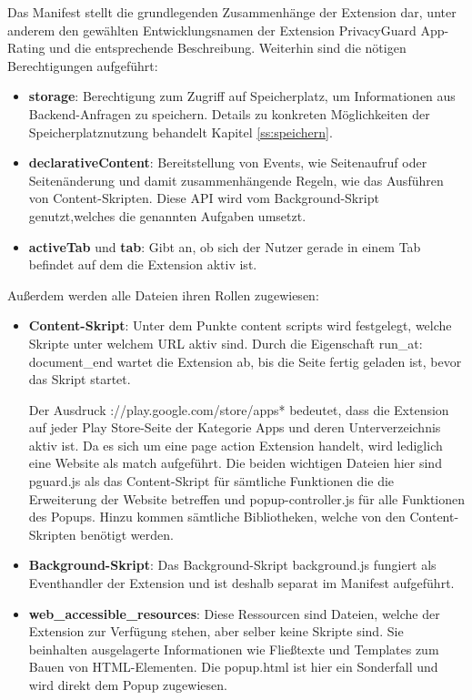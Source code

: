Das Manifest stellt die grundlegenden Zusammenhänge der Extension dar, unter anderem den gewählten Entwicklungsnamen der Extension \glqq PrivacyGuard App-Rating\grqq{} und die entsprechende Beschreibung.
Weiterhin sind die nötigen Berechtigungen aufgeführt:

\begin{itemize}
	\item \textbf{storage}:
	Berechtigung zum Zugriff auf Speicherplatz, um Informationen aus Backend-Anfragen zu speichern. Details zu konkreten Möglichkeiten der Speicherplatznutzung behandelt Kapitel \ref{ss:speichern}.
	\item \textbf{declarativeContent}:
	Bereitstellung von Events, wie Seitenaufruf oder Seitenänderung und damit zusammenhängende Regeln, wie das Ausführen von Content-Skripten. Diese API wird vom Background-Skript genutzt,welches die genannten Aufgaben umsetzt.
	\item \textbf{activeTab} und \textbf{tab}:
	Gibt an, ob sich der Nutzer gerade in einem Tab befindet auf dem die Extension aktiv ist.
\end{itemize}

Außerdem werden alle Dateien ihren Rollen zugewiesen:

\begin{itemize}
	\item \textbf{Content-Skript}:
	Unter dem Punkte \glqq content scripts \grqq{} wird festgelegt, welche Skripte unter welchem URL aktiv sind. Durch die Eigenschaft \glqq run\_at: document\_end \grqq{} wartet die Extension ab, bis die Seite fertig geladen ist, bevor das Skript startet.
	
	Der Ausdruck \glqq *://play.google.com/store/apps*\grqq{}
	bedeutet, dass die Extension auf jeder Play Store-Seite der Kategorie Apps und deren Unterverzeichnis aktiv ist. Da es sich um eine \glqq page action\grqq{} Extension handelt, wird lediglich eine Website als \glqq match \grqq{} aufgeführt. Die beiden wichtigen Dateien hier sind \glqq pguard.js\grqq{} als das Content-Skript für sämtliche Funktionen die die Erweiterung der Website betreffen und \glqq popup-controller.js\grqq{} für alle Funktionen des Popups. Hinzu kommen sämtliche Bibliotheken, welche von den Content-Skripten benötigt werden.
	
	\item \textbf{Background-Skript}:
	Das Background-Skript \glqq background.js\grqq{} fungiert als Eventhandler der Extension und ist deshalb separat im Manifest aufgeführt.
	
	\item \textbf{web\_accessible\_resources}:
	Diese Ressourcen sind Dateien, welche der Extension zur Verfügung stehen, aber selber keine Skripte sind. Sie beinhalten ausgelagerte Informationen wie Fließtexte und Templates zum Bauen von HTML-Elementen. Die \glqq popup.html\grqq{} ist hier ein Sonderfall und wird direkt dem Popup zugewiesen.
\end{itemize}



